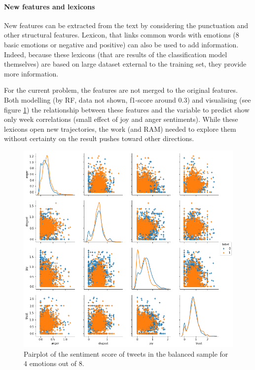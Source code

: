 \documentclass[a4paper, justified]{tufte-handout}
\begin{document}
\begin{fullwidth}
\paragraph{New features and lexicons}

New features can be extracted from the text by considering the punctuation and other structural features. Lexicon, that links common words with emotions (8 basic emotions or negative and positive) can also be used to add information. Indeed, because these lexicons (that are results of the classification model themselves) are based on large dataset external to the training set, they provide more information.

For the current problem, the features are not merged to the original features. Both modelling (by RF, data not shown, f1-score around 0.3) and visualising (see figure \ref{sentiment}) the relationship between these features and the variable to predict show only week correlations (small effect of joy and anger sentiments). While these lexicons open new trajectories, the work (and RAM) needed to explore them without certainty on the result pushes toward other directions.

\begin{figure}\label{sentiment}
  \includegraphics[]{images/sentiment_scores.png}
  \caption{Pairplot of the sentiment score of tweets in the balanced sample for 4 emotions out of 8.}
\end{figure}


\end{fullwidth}
\end{document}

